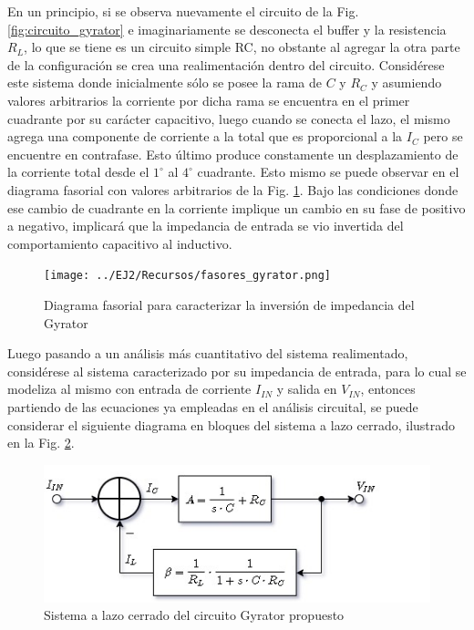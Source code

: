 En un principio, si se observa nuevamente el circuito de la Fig. \ref{fig:circuito_gyrator} e imaginariamente se desconecta el buffer y la resistencia $R_L$, lo que se tiene es un circuito simple RC,
no obstante al agregar la otra parte de la configuraci\'on se crea una realimentaci\'on dentro del circuito. Consid\'erese este sistema donde inicialmente s\'olo se posee la rama de $C$ y $R_C$ y asumiendo valores arbitrarios la corriente por dicha rama se encuentra en el primer cuadrante por su car\'acter capacitivo, luego cuando
se conecta el lazo, el mismo agrega una componente de corriente a la total que es proporcional a la $I_C$ pero se encuentre en contrafase. Esto \'ultimo produce constamente un desplazamiento de la corriente
total desde el $1^{\circ}$ al $4^{\circ}$ cuadrante. Esto mismo se puede observar en el diagrama fasorial con valores arbitrarios de la Fig. \ref{fig:fasores_gyrator}. Bajo las condiciones donde ese cambio de cuadrante en la corriente implique un cambio en su fase de positivo a negativo,
implicar\'a que la impedancia de entrada se vio invertida del comportamiento capacitivo al inductivo.

\begin{figure}[H]
    \centering
    \texttt{[image: ../EJ2/Recursos/fasores\_gyrator.png]}
    \caption{Diagrama fasorial para caracterizar la inversi\'on de impedancia del Gyrator}
    \label{fig:fasores_gyrator}
\end{figure}

Luego pasando a un an\'alisis m\'as cuantitativo del sistema realimentado, consid\'erese al sistema caracterizado por su impedancia de entrada, para lo cual se modeliza al mismo con entrada de corriente $I_{IN}$ y salida en $V_{IN}$,
entonces partiendo de las ecuaciones ya empleadas en el an\'alisis circuital, se puede considerar el siguiente diagrama en bloques del sistema a lazo cerrado, ilustrado en la Fig. \ref{fig:sistema_gyrator}.

\begin{figure}[H]
    \centering
    \includegraphics[scale=0.7]{../EJ2/Recursos/sistema_gyrator.jpg}
    \caption{Sistema a lazo cerrado del circuito Gyrator propuesto}
    \label{fig:sistema_gyrator}
\end{figure}

